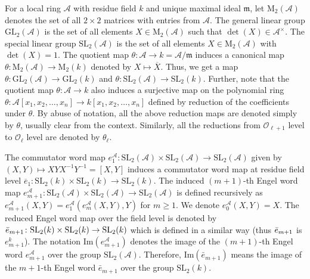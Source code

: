 \documentclass[10pt,twoside]{amsart}
\newcommand{\GL}{\mathrm{GL}}
\newcommand{\SL}{\mathrm{SL}}
\newcommand{\M}{\mathrm{M}}
\newcommand{\im}{\mathrm{Im}}
\theoremstyle{definition}
\theoremstyle{definition}
\begin{document}
For a local ring $\mathcal{A}$ with residue field $k$ and unique maximal ideal $\mathfrak{m}$, let $\M_2(\mathcal{A})$ denotes the set of all $2\times 2$ matrices with entries from $\mathcal{A}$. The general linear group $\GL_2(\mathcal{A})$ is the set of all elements $X\in \M_2(\mathcal{A})$ such that $\det(X) \in \mathcal{A}^{\times}$. The special linear group $\SL_2(\mathcal{A})$ is the set of all elements $X\in \M_2(\mathcal{A})$ with $\det(X)=1$. The quotient map $\theta \colon \mathcal{A} \rightarrow k =\mathcal{A}/ \mathfrak{m}$ induces a canonical map $\theta \colon \M_2(\mathcal{A}) \rightarrow \M_2(k)$ denoted by $X\mapsto \overline{X}$. Thus, we get a map $\theta\colon \GL_2(\mathcal{A}) \rightarrow \GL_2(k)$ and $\theta\colon \SL_2(\mathcal{A}) \rightarrow \SL_2(k)$. Further, note that the quotient map $\theta\colon \mathcal{A} \rightarrow k$ also induces a surjective map on the polynomial ring $\theta \colon \mathcal{A}[x_1, x_2, \ldots, x_n] \rightarrow k[x_1, x_2, \ldots, x_n]$ defined by reduction of the coefficients under $\theta$. By abuse of notation, all the above reduction maps are denoted simply by $\theta$, usually clear from the context. Similarly, all the reductions from $\mathcal{O}_{\ell+1}$ level to $\mathcal{O}_{\ell}$ level are denoted by $\theta_{\ell}$. %

The commutator word map $e_1^{\mathcal{A}} \colon \SL_2(\mathcal{A}) \times
\SL_2(\mathcal{A}) \rightarrow \SL_2(\mathcal{A})$ given by  $(X, Y)\mapsto XYX^{-1}Y^{-1}=[X,Y]$ induces a commutator word map at residue field level $\overline{e}_1 \colon \SL_2(k) \times \SL_2(k) \rightarrow \SL_2(k)$. The induced $(m+1)$-th Engel word map $e_{m+1}^{\mathcal{A}} \colon \SL_2(\mathcal{A}) \times
\SL_2(\mathcal{A}) \rightarrow \SL_2(\mathcal{A})$ is defined recursively as $e_{m+1}^{\mathcal{A}}(X,Y) = e_1^{\mathcal{A}}(e_{m}^{\mathcal{A}}(X,Y), Y)$ for $m\geq 1$. We denote $e_0^{\mathcal{A}}(X, Y)=X$. The reduced Engel word map over the field level is denoted by $\Bar{e}_{m+1}\colon \SL_2(k) \times \SL_2(k)\rightarrow \SL_2(k) $ which is defined in a similar way (thus $\Bar{e}_{m+1}$ is $e_{m+1}^k$). The notation $\im(e_{m+1}^{\mathcal{A}})$ denotes the image of the $(m+1)$-th Engel word $e_{m+1}^{\mathcal{A}}$ over the group $\SL_2(\mathcal{A})$. Therefore, $\im(\bar e_{m+1})$ means the image of the $m+1$-th Engel word $\bar e_{m+1}$ over the group $\SL_2(k)$. 
\end{document}
